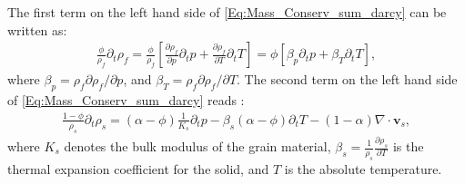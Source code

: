 The first term on the left hand side of \eqref{Eq:Mass_Conserv_sum_darcy} can be written as:
\begin{equation}\label{Eq:diff_rho_f}
\begin{aligned}
\frac{\phi}{\rho_f}\partial_t\rho_f = \frac{\phi}{\rho_f} \left[ \frac{\partial \rho_f}{\partial p}\partial_t p+\frac{\partial \rho_f}{\partial T}\partial_tT\right] = \phi \left[ \beta_p \partial_t p+ \beta_T \partial_tT\right],
\end{aligned}
\end{equation}
where $\beta_p=\rho_f{\partial\rho_f}/{\partial p}$, and $\beta_T=\rho_f{\partial\rho_f}/{\partial T}$.
The {second} term on the left hand side of \eqref{Eq:Mass_Conserv_sum_darcy} reads \cite{lewis1998finite}: %
\begin{equation}\label{Eq:diff_rho_s}
\begin{aligned}
\frac{1-\phi}{\rho_s} \partial_t\rho_s= \left(\alpha-\phi \right) \frac{1}{K_s} \partial_t p -\beta_s\left(\alpha-\phi \right) \partial_t T - \left(1-\alpha \right)  \nabla \cdot \mathbf{v}_s,
\end{aligned}
\end{equation}
where {$K_s$ denotes the bulk modulus of the grain material}, $\beta_s=\frac{1}{\rho_s}\frac{\partial\rho_s}{\partial T}$ is the thermal expansion coefficient for the solid, and $T$ is the absolute temperature.

